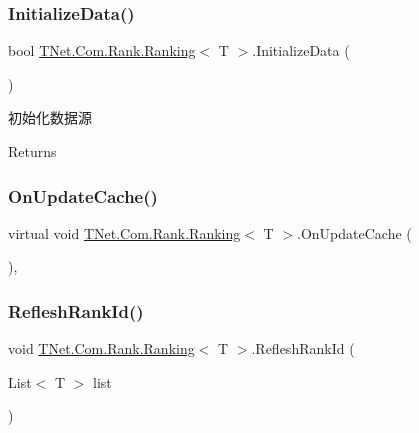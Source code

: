 \subsubsection{\texorpdfstring{Initialize\+Data()}{InitializeData()}}
{\footnotesize\ttfamily bool \mbox{\hyperlink{class_t_net_1_1_com_1_1_rank_1_1_ranking}{T\+Net.\+Com.\+Rank.\+Ranking}}$<$ T $>$.Initialize\+Data (\begin{DoxyParamCaption}{ }\end{DoxyParamCaption})\hspace{0.3cm}{\ttfamily [protected]}}



初始化数据源 

\begin{DoxyReturn}{Returns}

\end{DoxyReturn}
\mbox{\label{class_t_net_1_1_com_1_1_rank_1_1_ranking_a0f478ed3382d31882ec78c0b452df8fc}} 
\subsubsection{\texorpdfstring{On\+Update\+Cache()}{OnUpdateCache()}}
{\footnotesize\ttfamily virtual void \mbox{\hyperlink{class_t_net_1_1_com_1_1_rank_1_1_ranking}{T\+Net.\+Com.\+Rank.\+Ranking}}$<$ T $>$.On\+Update\+Cache (\begin{DoxyParamCaption}{ }\end{DoxyParamCaption})\hspace{0.3cm}{\ttfamily [protected]}, {\ttfamily [virtual]}}





\mbox{\label{class_t_net_1_1_com_1_1_rank_1_1_ranking_ae6e494ecbec1bc1b6945bd7e66c46ac4}} 
\subsubsection{\texorpdfstring{Reflesh\+Rank\+Id()}{RefleshRankId()}}
{\footnotesize\ttfamily void \mbox{\hyperlink{class_t_net_1_1_com_1_1_rank_1_1_ranking}{T\+Net.\+Com.\+Rank.\+Ranking}}$<$ T $>$.Reflesh\+Rank\+Id (\begin{DoxyParamCaption}\item[{List$<$ T $>$}]{list }\end{DoxyParamCaption})\hspace{0.3cm}{\ttfamily [protected]}}



